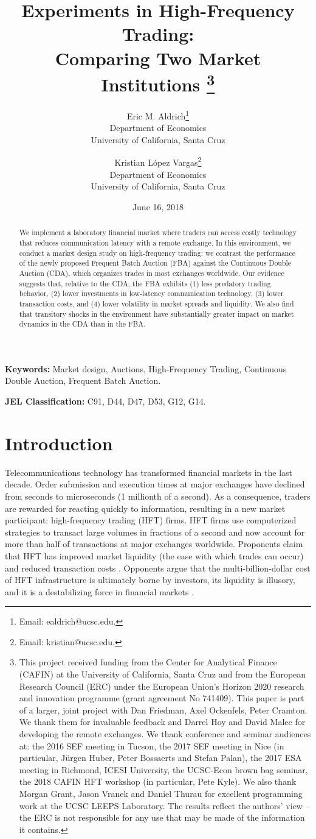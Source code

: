 \documentclass[12pt]{article}
\title{{\bf Experiments in High-Frequency Trading: \\ Comparing Two Market Institutions}
\thanks{This project received funding from the Center for Analytical Finance (CAFIN) at the University of California, Santa Cruz and from the European Research Council (ERC) under the European Union's Horizon 2020 research and innovation programme (grant agreement No 741409). 
This paper is part of a larger, joint project with Dan Friedman, Axel Ockenfels, Peter Cramton. We thank them for invaluable feedback and Darrel Hoy and David Malec for developing the remote exchanges. 
We thank conference and seminar audiences at: the 2016 SEF meeting in Tucson, the 2017 SEF meeting in Nice (in particular, J{\"u}rgen Huber, Peter Bossaerts and Stefan Palan), the 2017 ESA meeting in Richmond, ICESI University, the UCSC-Econ brown bag seminar, the 2018 CAFIN HFT workshop (in particular, Pete Kyle). 
We also thank  Morgan Grant, Jason Vranek and Daniel Thurau for excellent programming work at the UCSC LEEPS Laboratory.
The results reflect the authors' view -- the ERC is not responsible for any use that may be made of the information it contains.}}
\author{
  Eric M. Aldrich\thanks{
  Email: ealdrich@ucsc.edu.} \\
  \normalsize{Department of   Economics} \\
  \normalsize{University of California, Santa Cruz}
\and
  Kristian López Vargas\thanks{
  Email: kristian@ucsc.edu.} \\
  \normalsize{Department of Economics} \\
  \normalsize{University of California, Santa Cruz}
}
\begin{document}
\renewcommand{\baselinestretch}{1}

\date{June 16, 2018}

\maketitle

\vspace{-.25in}

\begin{abstract}
We implement a laboratory financial market where traders can access costly technology that reduces communication latency with a remote exchange. In this environment, we conduct a market design study on high-frequency trading: we contrast the performance of the newly proposed Frequent Batch Auction (FBA) against the Continuous Double Auction (CDA), which organizes trades in most exchanges worldwide. Our evidence suggests that, relative to the CDA, the FBA exhibits (1) less predatory trading behavior, (2) lower investments in low-latency communication technology, (3) lower transaction costs, and (4) lower volatility in market spreads and liquidity. We also find that transitory shocks in the environment have substantially greater impact on market dynamics in the CDA than in the FBA.
\end{abstract}

\noindent \textbf{Keywords:} Market design, Auctions, High-Frequency Trading, Continuous Double Auction, Frequent Batch Auction.

\noindent \textbf{JEL Classification:} C91, D44, D47, D53, G12, G14.

\renewcommand{\baselinestretch}{2}

\newpage

\section{Introduction \label{Intro}}

Telecommunications technology has transformed financial markets in the last decade. Order submission and execution times at major exchanges have declined from seconds to microseconds (1 millionth of a second). As a consequence, traders are rewarded for reacting quickly to information, resulting in a new market participant: high-frequency trading (HFT) firms. HFT firms use computerized strategies to transact large volumes in fractions of a second and now account for more than half of transactions at major exchanges worldwide. 
Proponents claim that HFT has improved market liquidity (the ease with which trades can occur) and reduced transaction costs \citep{Narang2010}. Opponents argue that the multi-billion-dollar cost of HFT infrastructure is ultimately borne by investors, its liquidity is illusory, and it is a destabilizing force in financial markets \citep{Lewis2015}. 
\end{document}
